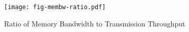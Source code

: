 \begin{figure}[H]
\texttt{[image: fig-membw-ratio.pdf]}
\caption{Ratio of Memory Bandwidth to Transmission Throughput}
\label{fig:membw-ratio}
\end{figure}
